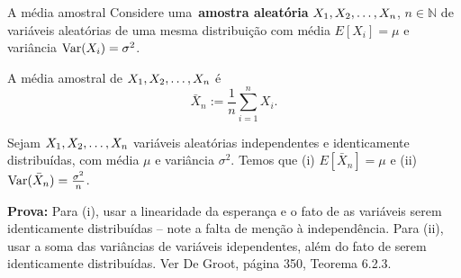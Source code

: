 \begin{frame}{A média amostral}
Considere uma~\textbf{amostra aleatória} $X_1, X_2, \ldots, X_n$, $n \in \mathbb{N}$ de variáveis aleatórias de uma mesma distribuição com média $E[X_i] = \mu$ e variância $\operatorname{Var}(X_i) = \sigma^2$.
\begin{defn}
 A média amostral de $X_1, X_2, \ldots, X_n$ é
 \begin{equation}
  \label{eq:sample_mean}
  \bar{X}_n := \frac{1}{n} \sum_{i = 1}^n X_i.
 \end{equation}
\end{defn}

\begin{theo}
\label{thm:iid_properties}
Sejam  $X_1, X_2, \ldots, X_n$ variáveis aleatórias independentes e identicamente distribuídas, com média $\mu$ e variância $\sigma^2$.
Temos que (i) $E[\bar{X}_n] = \mu$ e (ii) $\operatorname{Var}(\bar{X}_n) = \frac{\sigma^2}{n}$.
\end{theo}
\textbf{Prova:} Para (i), usar a linearidade da esperança e o fato de as variáveis serem identicamente distribuídas -- note a falta de menção à independência.
Para (ii), usar a soma das variâncias de variáveis idependentes, além do fato de serem identicamente distribuídas.
Ver De Groot, página 350, Teorema 6.2.3.
\end{frame}
